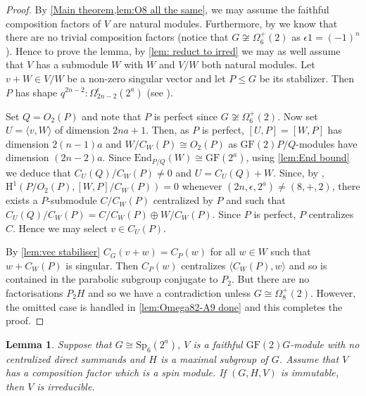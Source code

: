 \documentclass[12pt]{amsart}
\newtheorem{lemma}[theorem]{Lemma}
\theoremstyle{remark}
\theoremstyle{notation}
\theoremstyle{definition}
\newcommand{\GF}{\mathrm{GF}}
\newcommand{\Sp}{\mathrm{Sp}}
\newcommand{\0}{\emptyset}
\begin{document}
\begin{proof} By \cref{Main theorem,lem:O8 all the same}, we may assume  the faithful composition factors of $V$ are natural modules. Furthermore, by \cite[Tables B and C]{JonesParshall} we know that there are no trivial composition factors (notice that   $G \not \cong \Omega_6^+(2)$ as $\epsilon 1 = (-1)^n$).
Hence to prove the lemma, by \cref{lem: reduct to irred} we may as well assume that $V$ has a submodule $W$ with $W $ and $ V/W$ both natural modules.  Let $v +W\in V/W$ be a non-zero singular vector and let $P\le G$ be its stabilizer.  Then $P $ has shape $q^{2n-2}{:}\Omega_{2n-2}^\epsilon (2^a)$ (see \cite[Proposition 4.1.20]{KleidmanLiebeck}).

Set $Q= O_2(P)$ and note that $P$ is perfect since $G \not \cong \Omega_6^+(2)$.
Now set $U=\langle v,W\rangle$ of dimension $2na+1$.  Then, as $P$ is perfect, $[U,P]=[W,P]$ has dimension $2(n-1)a$ and $W/C_W(P) \cong O_2(P)$ as $\GF(2)P/Q$-modules have dimension $(2n-2)a$. Since $\mathrm{End}_{P/Q}(W) \cong \GF(2^a)$, using \cref{lem:End bound} we deduce that $C_U(Q)/C_W(P)\not=0$ and $U= C_U(Q) +W$. Since, by \cite[Tables B and C]{JonesParshall}, $\mathrm{H^1}(P/O_2(P),[W,P]/C_W(P))=0$ whenever $(2n,\epsilon,2^a) \ne (8,+,2)$, there exists a $P$-submodule $C/C_W(P)$ centralized  by $P$ and such that $C_U(Q)/C_W(P)= C/C_W(P)\oplus W/C_W(P)$. Since $P$ is perfect, $P$ centralizes $C$. Hence we may select $v \in C_U(P)$.

By \cref{lem:vec stabiliser} $C_G(v+w)= C_P(w)$ for all $w \in W$ such that $w+C_W(P)$ is singular.  Then $C_P(w)$ centralizes $\langle C_W(P),w\rangle$ and so is contained in the parabolic subgroup conjugate to $P_2$. But there are no factorisations $P_2H$ and so we have a contradiction unless $G\cong \Omega_{8}^+(2)$. However, the omitted case is handled in \cref{lem:Omega82-A9 done} and this completes the proof.
\end{proof}



\begin{lemma}\label{lem:spin yields irreducible}
Suppose that $G \cong \Sp_6(2^a)$, $V$ is a faithful $\GF(2)G$-module with no  centralized direct summands and $H$ is a maximal subgroup of $G$.
Assume that $V$ has a composition factor which is a spin module. If $(G,H,V)$ is immutable, then $V$ is irreducible.
\end{lemma}
\end{document}
